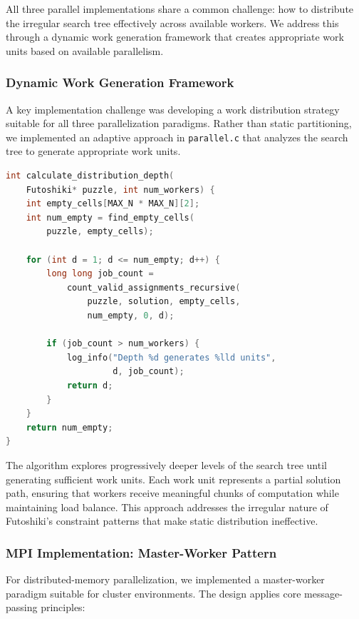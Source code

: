 All three parallel implementations share a common challenge: how to distribute the irregular search tree effectively across available workers. We address this through a dynamic work generation framework that creates appropriate work units based on available parallelism.

\subsubsection{Dynamic Work Generation Framework}
\label{subsubsec:dynamic_load_balancing}
A key implementation challenge was developing a work distribution strategy suitable for all three parallelization paradigms. Rather than static partitioning, we implemented an adaptive approach in \texttt{parallel.c} that analyzes the search tree to generate appropriate work units.

\begin{lstlisting}[language=C, caption=Dynamic depth calculation for work generation, label={listing:work_generation}]
int calculate_distribution_depth(
    Futoshiki* puzzle, int num_workers) {
    int empty_cells[MAX_N * MAX_N][2];
    int num_empty = find_empty_cells(
        puzzle, empty_cells);
    
    for (int d = 1; d <= num_empty; d++) {
        long long job_count = 
            count_valid_assignments_recursive(
                puzzle, solution, empty_cells, 
                num_empty, 0, d);
        
        if (job_count > num_workers) {
            log_info("Depth %d generates %lld units", 
                     d, job_count);
            return d;
        }
    }
    return num_empty;
}
\end{lstlisting}

The algorithm explores progressively deeper levels of the search tree until generating sufficient work units. Each work unit represents a partial solution path, ensuring that workers receive meaningful chunks of computation while maintaining load balance. This approach addresses the irregular nature of Futoshiki's constraint patterns that make static distribution ineffective.

\subsubsection{MPI Implementation: Master-Worker Pattern}
\label{subsubsec:mpi_implementation}
For distributed-memory parallelization, we implemented a master-worker paradigm suitable for cluster environments. The design applies core message-passing principles:


